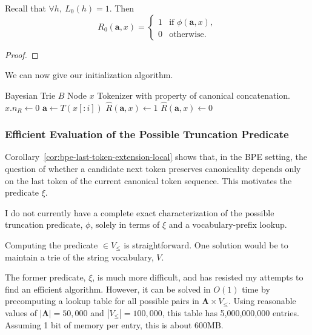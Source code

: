 \begin{theorem}
    Recall that $\forall h,\ L_0(h) = 1$. Then
    \[
    R_0(\mathbf{a}, x) =
    \begin{cases}
        1 & \text{if } \phi(\mathbf{a}, x), \\[3ex]
        0 & \text{otherwise.}
    \end{cases}
    \]
\end{theorem}
\begin{proof}
\end{proof}

We can now give our initialization algorithm.

\begin{algorithm}[H]
\caption{Initialize MTCDL}
\label{alg:initialize-mtcdl}
\begin{algorithmic}[1]
\Require Bayesian Trie $B$
\Require Node $x$
\Require Tokenizer with property of canonical concatenation.
\State $x.n_R \gets 0$
    \State $\mathbf{a} \gets T(x[:i])$
        \State $\widehat{R}(\mathbf{a}, x) \gets 1$
    \Else
        \State $\widehat{R}(\mathbf{a}, x) \gets 0$
    \EndIf
\EndFor
\end{algorithmic}
\end{algorithm}



\subsubsection{Efficient Evaluation of the Possible Truncation Predicate}
Corollary~\ref{cor:bpe-last-token-extension-local} shows that, in the BPE setting,
the question of whether a candidate next token preserves canonicality depends only on the
last token of the current canonical token sequence. This motivates the predicate $\xi$.

I do not currently have a complete exact characterization of the possible truncation predicate,
$\phi$, solely in terms of $\xi$ and a vocabulary-prefix lookup.

Computing the predicate $\in V_\leq$ is straightforward.
One solution would be to maintain a trie of the string vocabulary, $V$.

The former predicate, $\xi$, is much more difficult, 
and has resisted my attempts to find an efficient algorithm.
However, it can be solved in $O(1)$ time by precomputing a lookup table for all possible pairs in
$\boldsymbol{\Lambda} \times V_\leq$.
Using reasonable values of $|\boldsymbol{\Lambda}|=50,000$
and $|V_\leq|=100,000$, this table has 5,000,000,000 entries.
Assuming 1 bit of memory per entry, this is about 600MB.

